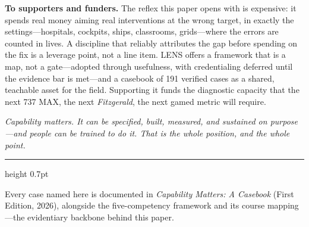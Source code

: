 \documentclass[11pt]{article}
\newcommand{\pullquote}[1]{%
  \begin{center}\begin{minipage}{0.86\linewidth}
  \color{lensquote}\itshape\large\RaggedRight #1
  \end{minipage}\end{center}}
\newcommand{\lead}[1]{{\color{lensaccent}\bfseries #1}}
\begin{document}
\lead{To supporters and funders.} The reflex this paper opens with is expensive: it spends real money aiming real interventions at the wrong target, in exactly the settings---hospitals, cockpits, ships, classrooms, grids---where the errors are counted in lives. A discipline that reliably attributes the gap before spending on the fix is a leverage point, not a line item. LENS offers a framework that is a map, not a gate---adopted through usefulness, with credentialing deferred until the evidence bar is met---and a casebook of 191 verified cases as a shared, teachable asset for the field. Supporting it funds the diagnostic capacity that the next 737 MAX, the next \emph{Fitzgerald}, the next gamed metric will require.

\pullquote{Capability matters. It can be specified, built, measured, and sustained on purpose---and people can be trained to do it. That is the whole position, and the whole point.}

\vfill
{\color{lensrule}\hrule height 0.7pt}
\vspace{0.5em}
{\footnotesize\color{lensquote}
Every case named here is documented in \emph{Capability Matters: A Casebook} (First Edition, 2026), alongside the five-competency framework and its course mapping---the evidentiary backbone behind this paper.}
\end{document}
